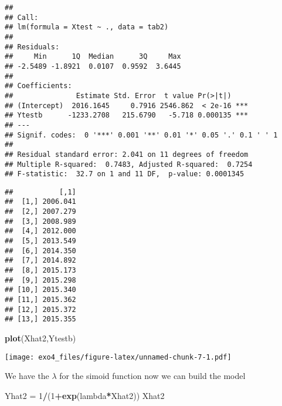 \documentclass[
]{article}
\newenvironment{Shaded}{\begin{snugshade}}{\end{snugshade}}
\newcommand{\DecValTok}[1]{\textcolor[rgb]{0.00,0.00,0.81}{#1}}
\newcommand{\KeywordTok}[1]{\textcolor[rgb]{0.13,0.29,0.53}{\textbf{#1}}}
\newcommand{\NormalTok}[1]{#1}
\newcommand{\OperatorTok}[1]{\textcolor[rgb]{0.81,0.36,0.00}{\textbf{#1}}}
\newcommand{\StringTok}[1]{\textcolor[rgb]{0.31,0.60,0.02}{#1}}
\begin{document}
\begin{verbatim}
## 
## Call:
## lm(formula = Xtest ~ ., data = tab2)
## 
## Residuals:
##     Min      1Q  Median      3Q     Max 
## -2.5489 -1.8921  0.0107  0.9592  3.6445 
## 
## Coefficients:
##               Estimate Std. Error  t value Pr(>|t|)    
## (Intercept)  2016.1645     0.7916 2546.862  < 2e-16 ***
## Ytestb      -1233.2708   215.6790   -5.718 0.000135 ***
## ---
## Signif. codes:  0 '***' 0.001 '**' 0.01 '*' 0.05 '.' 0.1 ' ' 1
## 
## Residual standard error: 2.041 on 11 degrees of freedom
## Multiple R-squared:  0.7483, Adjusted R-squared:  0.7254 
## F-statistic:  32.7 on 1 and 11 DF,  p-value: 0.0001345
\end{verbatim}

\begin{Shaded}
\end{Shaded}

\begin{verbatim}
##           [,1]
##  [1,] 2006.041
##  [2,] 2007.279
##  [3,] 2008.989
##  [4,] 2012.000
##  [5,] 2013.549
##  [6,] 2014.350
##  [7,] 2014.892
##  [8,] 2015.173
##  [9,] 2015.298
## [10,] 2015.340
## [11,] 2015.362
## [12,] 2015.372
## [13,] 2015.355
\end{verbatim}

\begin{Shaded}
\begin{Highlighting}[]
\KeywordTok{plot}\NormalTok{(Xhat2,Ytestb)}
\end{Highlighting}
\end{Shaded}

\texttt{[image: exo4\_files/figure-latex/unnamed-chunk-7-1.pdf]}

We have the \(\lambda\) for the simoid function now we can build the
model

\begin{Shaded}
\begin{Highlighting}[]
\NormalTok{Yhat2 =}\StringTok{ }\DecValTok{1}\OperatorTok{/}\NormalTok{(}\DecValTok{1}\OperatorTok{+}\KeywordTok{exp}\NormalTok{(lambda}\OperatorTok{*}\NormalTok{Xhat2))}
\NormalTok{Xhat2}
\end{Highlighting}
\end{Shaded}
\end{document}
